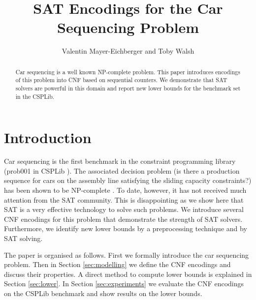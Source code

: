 \documentclass[]{llncs}
\author{Valentin Mayer-Eichberger and Toby Walsh}
\institute{NICTA and University of New South Wales \\
Locked Bag 6016, Sydney NSW 1466, Australia 
\email{\{valentin.mayer-eichberger,toby.walsh\}@nicta.com.au}
}
\title{SAT Encodings for the Car Sequencing Problem}
\begin{document}
 

\maketitle

\begin{abstract} 
    Car sequencing is a well known NP-complete problem. This paper introduces encodings of this problem into CNF based
    on sequential counters. We demonstrate that SAT solvers are powerful in this domain and report new lower bounds for
    the benchmark set in the CSPLib.
\end{abstract}

\section{Introduction}

Car sequencing is the first benchmark in the constraint programming library (prob001 in CSPLib \cite{Gent99}). The
associated decision problem (is there a production sequence for cars on the assembly line satisfying the sliding
capacity constraints?) has been shown to be NP-complete \cite{Kis04}\cite{Gent98}.  To date, however, it has not
received much attention from the SAT community.  This is disappointing as we show here that SAT is a very effective
technology to solve such problems. We introduce several CNF encodings for this problem that demonstrate the strength of
SAT solvers. Furthermore, we identify new lower bounds by a preprocessing technique and by SAT solving.

The paper is organised as follows. First we formally introduce the car sequencing problem. Then in Section
\ref{sec:modelling} we define the CNF encodings and discuss their properties. A direct method to compute lower bounds is
explained in Section \ref{sec:lower}. In Section \ref{sec:experiments} we evaluate the CNF encodings on the CSPLib
benchmark and show results on the lower bounds. 
\end{document}
